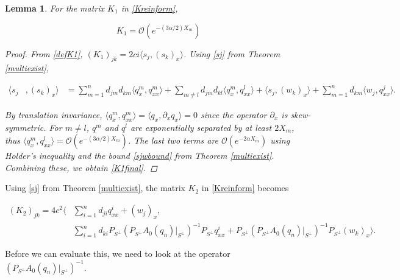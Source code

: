 \documentclass[12pt]{article}
\newtheorem{lemma}{Lemma}
\begin{document}
\begin{lemma}\label{K1small}
For the matrix $K_1$ in \eqref{Kreinform}, 

\begin{equation}\label{K1final}
K_1 = \mathcal{O}(e^{-(3 \alpha/2) X_m})
\end{equation}

\begin{proof}
From \eqref{defK1}, $(K_1)_{jk} = 2 c i \langle s_j, (s_k)_x \rangle$. Using \eqref{sj} from Theorem \ref{multiexist},

\begin{align}
\langle s_j &, (s_k)_x \rangle 
&= \sum_{m = 1}^{n} d_{jm} d_{km} \langle q^m_x, q^m_{xx} \rangle 
+ \sum_{m \neq l} d_{jm} d_{kl} \langle q^m_x, q^l_{xx} \rangle 
+ \langle s_j, (w_k)_x \rangle 
+ \sum_{m = 1}^{n} d_{km} \langle w_j, q^j_{xx} \rangle.
\end{align}  

By translation invariance, $\langle q^m_x, q^m_{xx} \rangle = \langle q_x, \partial_x q_x \rangle = 0$ since the operator $\partial_x$ is skew-symmetric. For $m \neq l$, $q^m$ and $q^l$ are exponentially separated by at least $2 X_m$, thus $\langle q^m_x, q^l_{xx} \rangle = \mathcal{O}(e^{-(3 \alpha/2) X_m})$. The last two terms are $\mathcal{O}(e^{-2 \alpha X_m})$ using Holder's inequality and the bound \eqref{sjwbound} from Theorem \ref{multiexist}. Combining these, we obtain \eqref{K1final}.

\end{proof}
\end{lemma}

Using \eqref{sj} from Theorem \eqref{multiexist}, the matrix $K_2$ in \eqref{Kreinform} becomes

\begin{align}\label{K2expansion}
(K_2)_{jk} 
= 4 c^2 \langle &\sum_{i = 1}^{n} d_{ji} q^i_{xx} + (w_j)_x, \\
&\sum_{i = 1}^{n} d_{ki} P_{S^\perp} (P_{S^\perp} A_0(q_n)|_{S^\perp})^{-1} P_{S^\perp} q^i_{xx} + P_{S^\perp} (P_{S^\perp} A_0(q_n)|_{S^\perp})^{-1} P_{S^\perp} (w_k)_x \rangle \nonumber.
\end{align}

Before we can evaluate this, we need to look at the operator $(P_{S^\perp} A_0(q_n)|_{S^\perp})^{-1}$.

\end{document}
